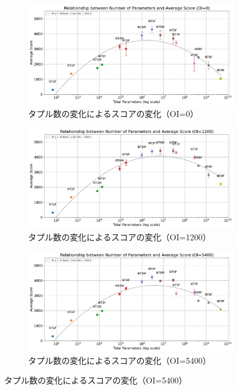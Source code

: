 \begin{figure}[t]
    \centering
    \begin{subfigure}[b]{\linewidth}
        \centering
        \includegraphics[width=\linewidth]{pdf/parameter_performance_plots/params_performance_OI0_EXP1.pdf}
        \caption{タプル数の変化によるスコアの変化（OI=0）}
        \label{fig:score_vs_tuple_OI0}
    \end{subfigure}

    \vspace{1em}
    \begin{subfigure}[b]{\linewidth}
        \centering
        \includegraphics[width=\linewidth]{pdf/parameter_performance_plots/params_performance_OI1200_EXP1.pdf}
        \caption{タプル数の変化によるスコアの変化（OI=1200）}
        \label{fig:score_vs_tuple_OI1200}
    \end{subfigure}

    \vspace{1em}
    \begin{subfigure}[b]{\linewidth}
        \centering
        \includegraphics[width=\linewidth]{pdf/parameter_performance_plots/params_performance_OI5400_EXP1.pdf}
        \caption{タプル数の変化によるスコアの変化（OI=5400）}
        \label{fig:score_vs_tuple_OI5400}
    \end{subfigure}


\end{figure}
